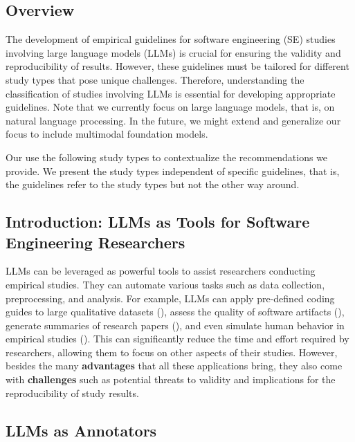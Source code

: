 



\subsection{Overview}

The development of empirical guidelines for software engineering (SE) studies involving large language models (LLMs) is crucial for ensuring the validity and reproducibility of results.
However, these guidelines must be tailored for different study types that pose unique challenges.
Therefore, understanding the classification of studies involving LLMs is essential for developing appropriate guidelines.
Note that we currently focus on large language models, that is, on natural language processing.
In the future, we might extend and generalize our focus to include multimodal foundation models.

Our \guidelines use the following study types to contextualize the recommendations we provide.
We present the study types independent of specific guidelines, that is, the guidelines refer to the study types but not the other way around.

\subsection{Introduction: LLMs as Tools for Software Engineering Researchers}

LLMs can be leveraged as powerful tools to assist researchers conducting empirical studies.
They can automate various tasks such as data collection, preprocessing, and analysis.
For example, LLMs can apply pre-defined coding guides to large qualitative datasets (\annotators), assess the quality of software artifacts (\judges), generate summaries of research papers (\synthesis), and even simulate human behavior in empirical studies (\participants).
This can significantly reduce the time and effort required by researchers, allowing them to focus on other aspects of their studies.
However, besides the many \textbf{advantages} that all these applications bring, they also come with \textbf{challenges} such as potential threats to validity and implications for the reproducibility of study results.


\subsection{LLMs as Annotators}

